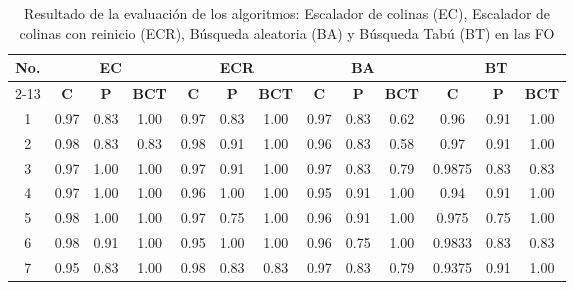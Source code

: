 \begin{table}[H]
	\centering
	\caption{Resultado de la evaluación de los algoritmos: Escalador de colinas (EC), Escalador de colinas con reinicio (ECR), Búsqueda aleatoria (BA) y Búsqueda Tabú (BT) en las FO} \label{table:resultados-docencia}
	\begin{tabular}{|c | c | c| c | c |c |c | c| c| c | c| c|c |}
		\toprule
		\multirow{3}{1cm}{\textbf{No.}} &                            \multicolumn{3}{c|}{\textbf{EC}}                             & \multicolumn{3}{c|}{\textbf{ECR}} & \multicolumn{3}{c|}{\textbf{BA}} & \multicolumn{3}{c|}{\textbf{BT}} \\
		   \cmidrule{2-13}     & \textbf{C}                        & \textbf{P}                        & \textbf{BCT}                      & \textbf{C}    & \textbf{P}    & \textbf{BCT}        & \textbf{C}    & \textbf{P}    & \textbf{BCT}       & \textbf{C}      & \textbf{P}    &   \textbf{BCT}   \\ \midrule
		          1            & 0.97                     & 0.83                     & 1.00                     & 0.97 & 0.83 & 1.00       & 0.97 & 0.83 & 0.62      & 0.96   & 0.91 &  1.00   \\ \hline
		          2            & 0.98                     & 0.83                     & 0.83                     & 0.98 & 0.91 & 1.00       & 0.96 & 0.83 & 0.58      & 0.97   & 0.91 &  1.00   \\ \hline
		          3            & 0.97                     & 1.00                     & 1.00                     & 0.97 & 0.91 & 1.00       & 0.97 & 0.83 & 0.79      & 0.9875 & 0.83 &  0.83   \\ \hline
		          4            & 0.97                     & 1.00                     & 1.00                     & 0.96 & 1.00 & 1.00       & 0.95 & 0.91 & 1.00      & 0.94   & 0.91 &  1.00   \\ \hline
		          5            & \cellcolor{gray!30} 0.98 & \cellcolor{gray!30} 1.00 & \cellcolor{gray!30}1.00  & 0.97 & 0.75 & 1.00       & 0.96 & 0.91 & 1.00      & 0.975  & 0.75 &  1.00   \\ \hline
		          6            & 0.98                     & 0.91                     & 1.00                     & 0.95 & 1.00 & 1.00       & 0.96 & 0.75 & 1.00      & 0.9833 & 0.83 &  0.83   \\ \hline
		          7            & 0.95                     & 0.83                     & 1.00                     & 0.98 & 0.83 & 0.83       & 0.97 & 0.83 & 0.79      & 0.9375 & 0.91 &  1.00   \\ \hline

\end{tabular}
\end{table}
